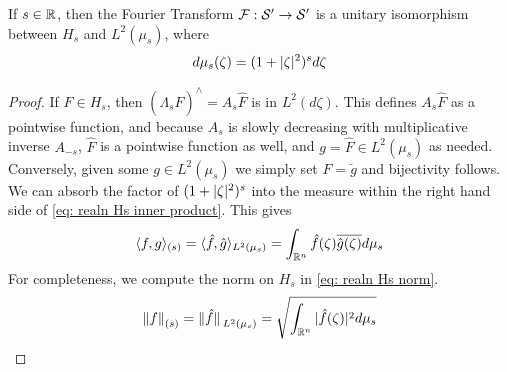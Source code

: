 \documentclass[../main-v2-manifolds.tex]{subfiles}
\begin{document}
\begin{lemma}
    If $s\in\mathbb{R}$, then the Fourier Transform $\mathcal{F}: \mathcal{S}'\to\mathcal{S}'$ is a unitary isomorphism between $H_s$ and $L^2(\mu_s)$, where 
    \[
        d\mu_s(\zeta)=(1+\vert {\zeta} \vert^2)^{s}d\zeta
    \]
\end{lemma}
\begin{proof}
    If $F\in H_s$, then $(\Lambda_s \hat{F})^{\wedge} = A_s\hat{F}$ is in $L^2(d\zeta)$. This defines $A_s\hat{F}$ as a pointwise function, and because $A_s$ is slowly decreasing with multiplicative inverse $A_{-s}$, $\hat{F}$ is a pointwise function as well, and $g = \hat{F}\in L^2(\mu_s)$ as needed.\\

    Conversely, given some $g\in L^2(\mu_s)$ we simply set $F = \breve{g}$ and bijectivity follows. We can absorb the factor of $(1+\vert {\zeta} \vert^2)^s$ into the measure within the right hand side of \cref{eq: realn Hs inner product}. This gives
    \begin{equation}
        \langle f,g\rangle_{(s)} = \langle \hat{f},\hat{g}\rangle_{L^2(\mu_s)}=\int_{{\mathbb{R}^n}}\hat{f}(\zeta)\overline{\hat{g}(\zeta)}d\mu_s
        \label{eq: realn Hs inner product fourier trans}
    \end{equation}
    For completeness, we compute the norm on $H_s$ in \cref{eq: realn Hs norm}.
    \begin{equation}
        \norm{f}_{(s)} = \norm*{\hat{f}}_{L^2(\mu_s)}=\sqrt{\int_{{\mathbb{R}^n}}\vert {\hat{f}(\zeta)} \vert^2d\mu_s}
        \label{eq: realn Hs norm}
    \end{equation}
\end{proof}

\end{document}
